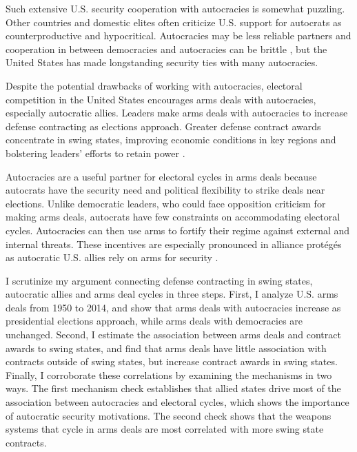 \documentclass[12pt]{article}
\begin{document}
Such extensive U.S. security cooperation with autocracies is somewhat puzzling.
Other countries and domestic elites often criticize U.S. support for autocrats as counterproductive and hypocritical. 
Autocracies may be less reliable partners \citep{Gaubatz1996} and cooperation in between democracies and autocracies can be brittle \citep{Leeds1999}, but the United States has made longstanding security ties with many autocracies.  


Despite the potential drawbacks of working with autocracies, electoral competition in the United States encourages arms deals with autocracies, especially autocratic allies.
Leaders make arms deals with autocracies to increase defense contracting as elections approach.
Greater defense contract awards concentrate in swing states, improving economic conditions in key regions and bolstering leaders' efforts to retain power \citep{Tufte1978, Mintz1988, Mayer1995, DerouenHeo2000, Becker2021}. 


Autocracies are a useful partner for electoral cycles in arms deals because autocrats have the security need and political flexibility to strike deals near elections. 
Unlike democratic leaders, who could face opposition criticism for making arms deals, autocrats have few constraints on accommodating electoral cycles.
Autocracies can then use arms to fortify their regime against external and internal threats.
These incentives are especially pronounced in alliance prot{\'e}g{\'e}s as autocratic U.S. allies rely on arms for security \citep{McManusYarhi-Milo2017}.


I scrutinize my argument connecting defense contracting in swing states, autocratic allies and arms deal cycles in three steps. 
First, I analyze U.S. arms deals from 1950 to 2014, and show that arms deals with autocracies increase as presidential elections approach, while arms deals with democracies are unchanged. 
Second, I estimate the association between arms deals and contract awards to swing states, and find that arms deals have little association with contracts outside of swing states, but increase contract awards in swing states. 
Finally, I corroborate these correlations by examining the mechanisms in two ways.
The first mechanism check establishes that allied states drive most of the association between autocracies and electoral cycles, which shows the importance of autocratic security motivations. 
The second check shows that the weapons systems that cycle in arms deals are most correlated with more swing state contracts.
\end{document}

